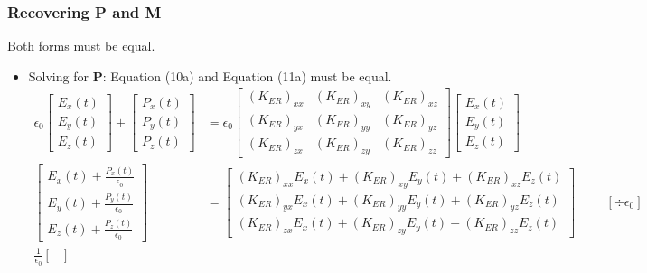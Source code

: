 \subsubsection{Recovering P and M}
Both forms must be equal.
\begin{itemize}
  \item Solving for \( \mathbf{P} \): Equation (10a)
    and Equation (11a) must be equal.
    \begin{align*}
      \epsilon_0
      \begin{bmatrix}
        E_x(t) \\
        E_y(t) \\
        E_z(t)
      \end{bmatrix} +
      \begin{bmatrix}
        P_x(t) \\
        P_y(t) \\
        P_z(t)
      \end{bmatrix}
      &= \epsilon_0
      \begin{bmatrix}
        (K_{ER})_{xx} & (K_{ER})_{xy} & (K_{ER})_{xz} \\
        (K_{ER})_{yx} & (K_{ER})_{yy} & (K_{ER})_{yz} \\
        (K_{ER})_{zx} & (K_{ER})_{zy} & (K_{ER})_{zz}
      \end{bmatrix}
      \begin{bmatrix}
        E_x(t) \\
        E_y(t) \\
        E_z(t)
      \end{bmatrix} \\
      \begin{bmatrix}
        E_x(t) + \frac{P_x(t)}{\epsilon_0} \\
        E_y(t) + \frac{P_y(t)}{\epsilon_0} \\
        E_z(t) + \frac{P_z(t)}{\epsilon_0}
      \end{bmatrix}
      &=
      \begin{bmatrix}
        (K_{ER})_{xx} E_x(t) + (K_{ER})_{xy} E_y(t) + (K_{ER})_{xz} E_z(t) \\
        (K_{ER})_{yx} E_x(t) + (K_{ER})_{yy} E_y(t) + (K_{ER})_{yz} E_z(t) \\
        (K_{ER})_{zx} E_x(t) + (K_{ER})_{zy} E_y(t) + (K_{ER})_{zz} E_z(t)
      \end{bmatrix} \hspace{1cm} \left[\div \epsilon_0\right] \\
      \frac{1}{\epsilon_0}\begin{bmatrix}

\end{bmatrix}
\end{align*}
\end{itemize}
